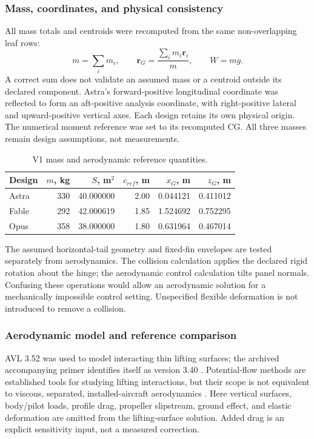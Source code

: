 \documentclass[11pt,a4paper]{article}
\begin{document}
\subsubsection{Mass, coordinates, and physical consistency}
All mass totals and centroids were recomputed from the same non-overlapping leaf rows:
\begin{equation}
m=\sum_i m_i,\qquad \boldsymbol r_G=\frac{\sum_i m_i\boldsymbol r_i}{m},\qquad W=mg.
\label{eq:mass}
\end{equation}
A correct sum does not validate an assumed mass or a centroid outside its declared component. Astra's forward-positive longitudinal coordinate was reflected to form an aft-positive analysis coordinate, with right-positive lateral and upward-positive vertical axes. Each design retains its own physical origin. The numerical moment reference was set to its recomputed CG. All three masses remain design assumptions, not measurements.

\begin{table}[H]\centering\small
\caption{V1 mass and aerodynamic reference quantities.}\label{tab:refs}
\begin{tabular}{lrrrrr}\toprule
Design & $m$, kg & $S$, m$^2$ & $c_{ref}$, m & $x_G$, m & $z_G$, m\\\midrule
Astra &330&40.000000&2.00&0.044121&0.411012\\
Fable &292&42.000619&1.85&1.524692&0.752295\\
Opus &358&38.000000&1.80&0.631964&0.467014\\\bottomrule
\end{tabular}
\end{table}

The assumed horizontal-tail geometry and fixed-fin envelopes are tested separately from aerodynamics. The collision calculation applies the declared rigid rotation about the hinge; the aerodynamic control calculation tilts panel normals. Confusing these operations would allow an aerodynamic solution for a mechanically impossible control setting. Unspecified flexible deformation is not introduced to remove a collision.

\subsubsection{Aerodynamic model and reference comparison}
AVL 3.52 was used to model interacting thin lifting surfaces; the archived accompanying primer identifies itself as version 3.40 \cite{ref20}. Potential-flow methods are established tools for studying lifting interactions, but their scope is not equivalent to viscous, separated, installed-aircraft aerodynamics \cite{ref21,ref22}. Here vertical surfaces, body/pilot loads, profile drag, propeller slipstream, ground effect, and elastic deformation are omitted from the lifting-surface solution. Added drag is an explicit sensitivity input, not a measured correction.
\end{document}
